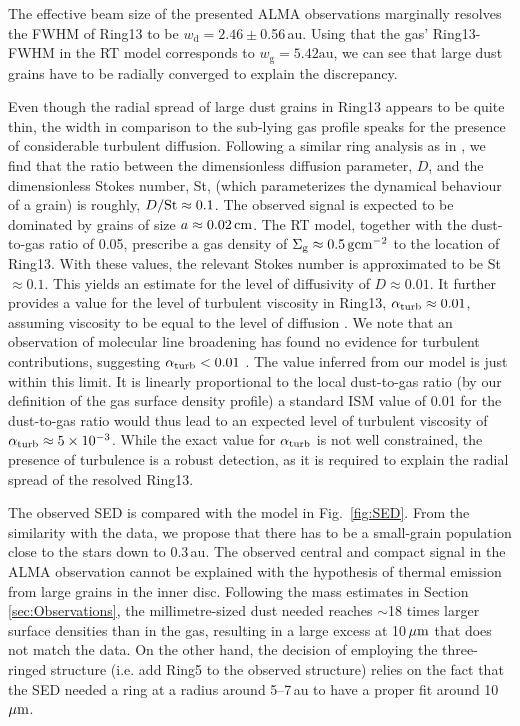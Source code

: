 \documentclass[fleqn,usenatbib,useAMS]{mnras}
\begin{document}
The effective beam size of the presented ALMA observations marginally resolves the FWHM of Ring13 to be $w_\mathrm{d} = 2.46\pm$0.56\,au. Using that the gas' Ring13-FWHM in the RT model corresponds to $w_\mathrm{g} = 5.42\mathrm{au}$, we can see that large dust grains have to be radially converged to explain the discrepancy.

Even though the radial spread of large dust grains in Ring13 appears to be quite thin, the width in comparison to the sub-lying gas profile speaks for the presence of considerable turbulent diffusion. Following a similar ring analysis as in \citet{2018ApJ...869L..46D}, we find that the ratio between the dimensionless diffusion parameter, $D$, and the dimensionless Stokes number, St, (which parameterizes the dynamical behaviour of a grain) is roughly, $D/{\rm St}\approx 0.1$. The observed signal is expected to be dominated by grains of size $a\approx 0.02\,{\rm cm}$. The RT model, together with the dust-to-gas ratio of 0.05, prescribe a gas density of $\Sigma_{\rm g} \approx 0.5\,{\rm g}{\rm cm}^{-2}$ to the location of Ring13. With these values, the relevant Stokes number is approximated to be St$\approx 0.1$. This yields an estimate for the level of diffusivity of $D\approx 0.01$. It further provides a value for the level of turbulent viscosity in Ring13, $\alpha_{\rm turb}\approx 0.01$, assuming viscosity to be equal to the level of diffusion \citep{2007Icar..192..588Y}. We note that an observation of molecular line broadening has found no evidence for turbulent contributions, suggesting $\alpha_{\rm turb}<0.01$ \citep{Flaherty_2020}. The value inferred from our model is just within this limit. It is linearly proportional to the local dust-to-gas ratio (by our definition of the gas surface density profile) a standard ISM  value of 0.01 for the dust-to-gas ratio would thus lead to an expected level of turbulent viscosity of $\alpha_{\rm turb}\approx 5\times10^{-3}$. While the exact value for $\alpha_{\rm turb}$ is not well constrained, the presence of turbulence is a robust detection, as it is required to explain the radial spread of the resolved Ring13.

The observed SED is compared with the model in Fig.~\ref{fig:SED}. From the similarity with the data, we propose that there has to be a small-grain population close to the stars down to 0.3\,au. The observed central and compact signal in the ALMA observation cannot be explained with the hypothesis of thermal emission from large grains in the inner disc. Following the mass estimates in Section\,\ref{sec:Observations}, the millimetre-sized dust needed reaches $\sim$18 times larger surface densities than in the gas, resulting in a large excess at 10$\,\hbox{$\mu$m}$ that does not match the data. On the other hand, the decision of employing the three-ringed structure (i.e. add Ring5 to the observed structure) relies on the fact that the SED needed a ring at a radius around 5--7\,au to have a proper fit around 10\,$\hbox{$\mu$m}$. 
\end{document}

